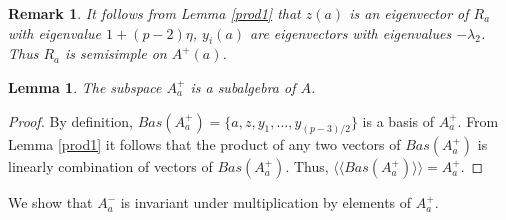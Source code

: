 \documentclass[12pt]{article}
\newcommand\lm{\lambda}
\newcommand\la{\langle}
\newcommand\ra{\rangle}
\newcommand\lla{\la\!\la}
\newcommand\rra{\ra\!\ra}
\newtheorem{lem}{Lemma}
\newtheorem{rem}{Remark}
\begin{document}
\begin{rem}\label{Raeigenvector}
 It follows from Lemma \ref{prod1} that $z(a)$ is an eigenvector of $R_a$ with eigenvalue $1+(p-2)\eta$,  $y_i(a)$ are eigenvectors with eigenvalues $-\lm_2$. Thus $R_a$ is semisimple on $A^{+}(a)$.
 
\end{rem}

\begin{lem}\label{aplus}
	The subspace $A_a^+$ is a subalgebra of $A$. 
\end{lem}
\begin{proof}
	By definition, $Bas(A_a^+)=\{a, z, y_1,..., y_{(p-3)/2}\}$ is a basis of $A_a^+$. From Lemma \ref{prod1} it follows that the product of any two vectors of $Bas(A_a^+)$ is linearly combination of vectors of $Bas(A_a^+)$. Thus, $\lla Bas(A_a^+)\rra=A_a^+$.
\end{proof}

We show that $A_a^-$ is invariant under multiplication by elements of $A_a^+$.
\end{document}
